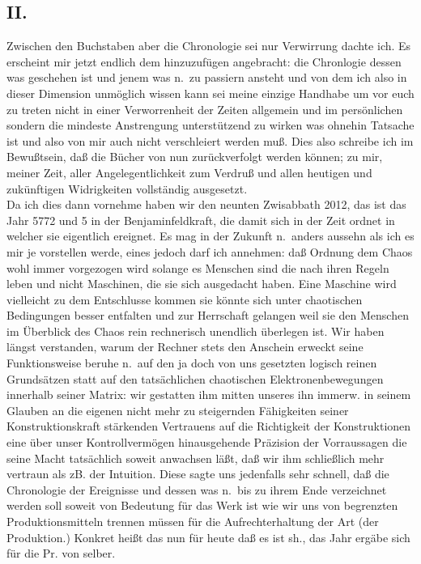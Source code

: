 \documentclass[
]{article}
\author{}
\date{\vspace{-2.5em}}
\begin{document}
\subsection{II.}\label{ii.}

Zwischen den Buchstaben aber die Chronologie sei nur Verwirrung dachte
ich. Es erscheint mir jetzt endlich dem hinzuzufügen angebracht: die
Chronlogie dessen was geschehen ist und jenem was n.~zu passiern ansteht
und von dem ich also in dieser Dimension unmöglich wissen kann sei meine
einzige Handhabe um vor euch zu treten nicht in einer Verworrenheit der
Zeiten allgemein und im persönlichen sondern die mindeste Anstrengung
unterstützend zu wirken was ohnehin Tatsache ist und also von mir auch
nicht verschleiert werden muß. Dies also schreibe ich im Bewußtsein, daß
die Bücher von nun zurückverfolgt werden können; zu mir, meiner Zeit,
aller Angelegentlichkeit zum Verdruß und allen heutigen und zukünftigen
Widrigkeiten vollständig ausgesetzt.\\
Da ich dies dann vornehme haben wir den neunten Zwisabbath 2012, das ist
das Jahr 5772 und 5 in der Benjaminfeldkraft, die damit sich in der Zeit
ordnet in welcher sie eigentlich ereignet. Es mag in der Zukunft
n.~anders aussehn als ich es mir je vorstellen werde, eines jedoch darf
ich annehmen: daß Ordnung dem Chaos wohl immer vorgezogen wird solange
es Menschen sind die nach ihren Regeln leben und nicht Maschinen, die
sie sich ausgedacht haben. Eine Maschine wird vielleicht zu dem
Entschlusse kommen sie könnte sich unter chaotischen Bedingungen besser
entfalten und zur Herrschaft gelangen weil sie den Menschen im Überblick
des Chaos rein rechnerisch unendlich überlegen ist. Wir haben längst
verstanden, warum der Rechner stets den Anschein erweckt seine
Funktionsweise beruhe n.~auf den ja doch von uns gesetzten logisch
reinen Grundsätzen statt auf den tatsächlichen chaotischen
Elektronenbewegungen innerhalb seiner Matrix: wir gestatten ihm mitten
unseres ihn immerw. in seinem Glauben an die eigenen nicht mehr zu
steigernden Fähigkeiten seiner Konstruktionskraft stärkenden Vertrauens
auf die Richtigkeit der Konstruktionen eine über unser Kontrollvermögen
hinausgehende Präzision der Vorraussagen die seine Macht tatsächlich
soweit anwachsen läßt, daß wir ihm schließlich mehr vertraun als zB. der
Intuition. Diese sagte uns jedenfalls sehr schnell, daß die Chronologie
der Ereignisse und dessen was n.~bis zu ihrem Ende verzeichnet werden
soll soweit von Bedeutung für das Werk ist wie wir uns von begrenzten
Produktionsmitteln trennen müssen für die Aufrechterhaltung der Art (der
Produktion.) Konkret heißt das nun für heute daß es ist sh., das Jahr
ergäbe sich für die Pr. von selber.
\end{document}
